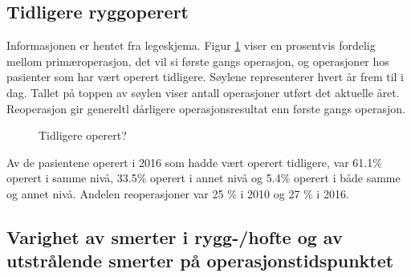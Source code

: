 \documentclass [norsk,a4paper,twoside]{article}\usepackage[]{graphicx}\usepackage[]{color}
\begin{document}
\clearpage

\subsection{Tidligere ryggoperert}
Informasjonen er hentet fra legeskjema.
Figur \ref{fig:TidlOp} viser en prosentvis fordelig mellom primæroperasjon, det vil si første gangs 
operasjon, og operasjoner hos pasienter som har vært operert tidligere.  
Søylene representerer hvert år frem til i dag. Tallet på toppen av søylen viser antall operasjoner utført 
det aktuelle året. Reoperasjon gir genereltl dårligere operasjonsresultat enn første gangs operasjon.



\begin{figure}[ht]
\caption{\label{fig:TidlOp} Tidligere operert? }
\end{figure}



Av de pasientene operert i 2016 som hadde vært operert tidligere, var 61.1\% 
operert i samme nivå, 33.5\% 
operert i annet nivå og 5.4\% 
operert i både samme og annet nivå.
Andelen reoperasjoner var 25 \% i 2010 og 27 \% i 2016.



\subsection{Varighet av smerter i rygg-/hofte og av utstrålende smerter på operasjonstidspunktet}
\end{document}
